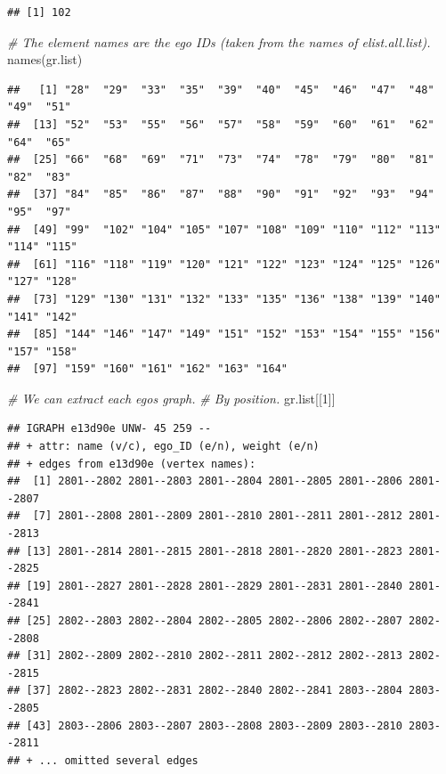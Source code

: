 \documentclass[
]{book}
\newenvironment{Shaded}{\begin{snugshade}}{\end{snugshade}}
\newcommand{\CommentTok}[1]{\textcolor[rgb]{0.56,0.35,0.01}{\textit{#1}}}
\newcommand{\DecValTok}[1]{\textcolor[rgb]{0.00,0.00,0.81}{#1}}
\newcommand{\FunctionTok}[1]{\textcolor[rgb]{0.00,0.00,0.00}{#1}}
\newcommand{\NormalTok}[1]{#1}
\begin{document}
\begin{verbatim}
## [1] 102
\end{verbatim}

\begin{Shaded}
\begin{Highlighting}[]
\CommentTok{\# The element names are the ego IDs (taken from the names of elist.all.list).}
\FunctionTok{names}\NormalTok{(gr.list)}
\end{Highlighting}
\end{Shaded}

\begin{verbatim}
##   [1] "28"  "29"  "33"  "35"  "39"  "40"  "45"  "46"  "47"  "48"  "49"  "51" 
##  [13] "52"  "53"  "55"  "56"  "57"  "58"  "59"  "60"  "61"  "62"  "64"  "65" 
##  [25] "66"  "68"  "69"  "71"  "73"  "74"  "78"  "79"  "80"  "81"  "82"  "83" 
##  [37] "84"  "85"  "86"  "87"  "88"  "90"  "91"  "92"  "93"  "94"  "95"  "97" 
##  [49] "99"  "102" "104" "105" "107" "108" "109" "110" "112" "113" "114" "115"
##  [61] "116" "118" "119" "120" "121" "122" "123" "124" "125" "126" "127" "128"
##  [73] "129" "130" "131" "132" "133" "135" "136" "138" "139" "140" "141" "142"
##  [85] "144" "146" "147" "149" "151" "152" "153" "154" "155" "156" "157" "158"
##  [97] "159" "160" "161" "162" "163" "164"
\end{verbatim}

\begin{Shaded}
\begin{Highlighting}[]
\CommentTok{\# We can extract each ego\textquotesingle{}s graph.}
\CommentTok{\# By position.}
\NormalTok{gr.list[[}\DecValTok{1}\NormalTok{]]}
\end{Highlighting}
\end{Shaded}

\begin{verbatim}
## IGRAPH e13d90e UNW- 45 259 -- 
## + attr: name (v/c), ego_ID (e/n), weight (e/n)
## + edges from e13d90e (vertex names):
##  [1] 2801--2802 2801--2803 2801--2804 2801--2805 2801--2806 2801--2807
##  [7] 2801--2808 2801--2809 2801--2810 2801--2811 2801--2812 2801--2813
## [13] 2801--2814 2801--2815 2801--2818 2801--2820 2801--2823 2801--2825
## [19] 2801--2827 2801--2828 2801--2829 2801--2831 2801--2840 2801--2841
## [25] 2802--2803 2802--2804 2802--2805 2802--2806 2802--2807 2802--2808
## [31] 2802--2809 2802--2810 2802--2811 2802--2812 2802--2813 2802--2815
## [37] 2802--2823 2802--2831 2802--2840 2802--2841 2803--2804 2803--2805
## [43] 2803--2806 2803--2807 2803--2808 2803--2809 2803--2810 2803--2811
## + ... omitted several edges
\end{verbatim}
\end{document}

